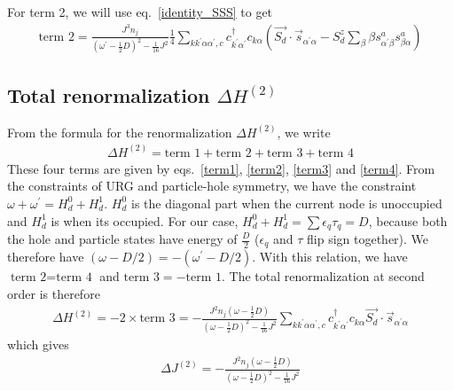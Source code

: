 \documentclass{revtex4-2}
\numberwithin{equation}{section}
\begin{document}
For term 2, we will use eq.~\ref{identity_SSS} to get
\begin{equation}\begin{aligned}
	\label{term4}
	\text{term 2} = \frac{J^3 n_j }{\left(\omega^\prime - \frac{1}{2}D\right)^2 - \frac{1}{16}J^2} \frac{1}{4}\sum_{k k^\prime \alpha \alpha^\prime,c} c^\dagger_{k^\prime\alpha^\prime} c_{k\alpha} \left(\vec{S_d}\cdot\vec{s}_{\alpha^\prime\alpha} -S_d^z \sum_\beta \beta s^a_{\alpha^\prime\beta} s^a_{\beta\alpha} \right)
\end{aligned}\end{equation}

\subsection{Total renormalization \(\Delta H^{(2)}\)}
From the formula for the renormalization \(\Delta H^{(2)}\), we write
\begin{equation}\begin{aligned}
	\Delta H^{(2)} = \text{term 1} + \text{term 2} + \text{term 3} + \text{term 4}
\end{aligned}\end{equation}
These four terms are given by eqs.~\ref{term1}, \ref{term2}, \ref{term3} and \ref{term4}.
From the constraints of URG and particle-hole symmetry, we have the constraint \(\omega + \omega^\prime = H_d^0 + H_d^1\). \(H_d^0\) is the diagonal part when the current node is unoccupied and \(H_d^1\) is when its occupied. For our case, \(H_d^0 + H_d^1 = \sum \epsilon_q \tau_q = D\), because both the hole and particle states have energy of \(\frac{D}{2}\) (\(\epsilon_q\) and \(\tau\) flip sign together). We therefore have \((\omega - D/2) = -(\omega^\prime - D/2)\). With this relation, we have \(\text{term 2} = \text{term 4}\) and \( \text{term 3} = -\text{term 1}\). The total renormalization at second order is therefore
\begin{equation}\begin{aligned}
	\Delta H^{(2)} = -2 \times \text{term 3} = -\frac{J^2 n_j \left(\omega - \frac{1}{2}D\right)}{\left(\omega - \frac{1}{2}D\right)^2 - \frac{1}{16}J^2} \sum_{k k^\prime \alpha \alpha^\prime,c} c^\dagger_{k^\prime\alpha^\prime} c_{k\alpha} \vec{S_d}\cdot\vec{s}_{\alpha^\prime \alpha}
\end{aligned}\end{equation}
which gives
\begin{equation}\begin{aligned}
	\Delta J^{(2)} = -\frac{J^2 n_j \left(\omega - \frac{1}{2}D\right)}{\left(\omega - \frac{1}{2}D\right)^2 - \frac{1}{16}J^2}
\end{aligned}\end{equation}
\end{document}
